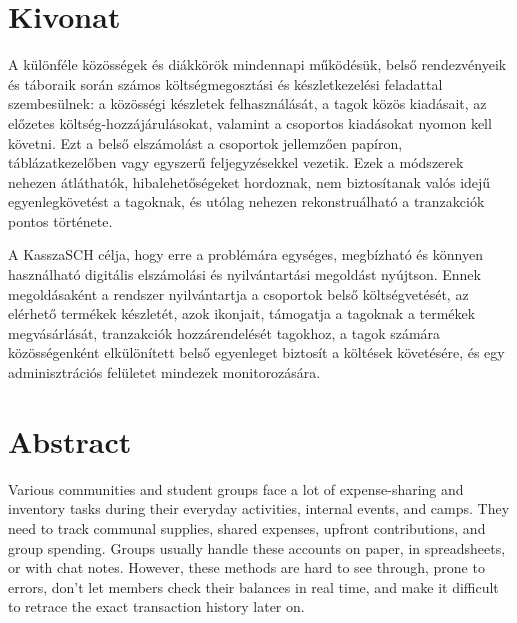 \setcounter{page}{1}

\selecthungarian

\chapter*{Kivonat}

A különféle közösségek és diákkörök mindennapi működésük, belső rendezvényeik és táboraik során számos költségmegosztási és készletkezelési feladattal szembesülnek: a közösségi készletek felhasználását, a tagok közös kiadásait, az előzetes költség-hozzájárulásokat, valamint a csoportos kiadásokat nyomon kell követni. Ezt a belső elszámolást a csoportok jellemzően papíron, táblázatkezelőben vagy egyszerű feljegyzésekkel vezetik. Ezek a módszerek nehezen átláthatók, hibalehetőségeket hordoznak, nem biztosítanak valós idejű egyenlegkövetést a tagoknak, és utólag nehezen rekonstruálható a tranzakciók pontos története.

A KasszaSCH célja, hogy erre a problémára egységes, megbízható és könnyen használható digitális elszámolási és nyilvántartási megoldást nyújtson. Ennek megoldásaként a rendszer nyilvántartja a csoportok belső költségvetését, az elérhető termékek készletét, azok ikonjait, támogatja a tagoknak a termékek megvásárlását, tranzakciók hozzárendelését tagokhoz, a tagok számára közösségenként elkülönített belső egyenleget biztosít a költések követésére, és egy adminisztrációs felületet mindezek monitorozására.


\vfill
\selectenglish


\chapter*{Abstract}

Various communities and student groups face a lot of expense-sharing and inventory tasks during their everyday activities, internal events, and camps. They need to track communal supplies, shared expenses, upfront contributions, and group spending. Groups usually handle these accounts on paper, in spreadsheets, or with chat notes. However, these methods are hard to see through, prone to errors, don't let members check their balances in real time, and make it difficult to retrace the exact transaction history later on.

